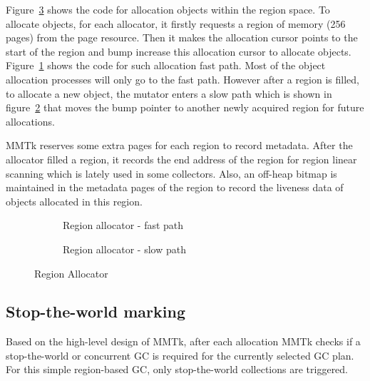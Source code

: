 Figure~\ref{fig:allocator} shows the code for allocation objects within the region space.
To allocate objects, for each allocator, it firstly requests a region of memory (256 pages) from the page resource.
Then it makes the allocation cursor points to the start of the region and bump increase this
allocation cursor to allocate objects. Figure~\ref{fig:allocator:fast} shows the code for such
allocation fast path. Most of the object allocation processes will only go to the
fast path. 
However after a region is filled, to allocate a new object, the mutator enters a slow path
which is shown in figure~\ref{fig:allocator:slow} that moves the bump pointer to another newly acquired region for future allocations.

MMTk reserves some extra pages for each region to record metadata.
After the allocator filled a region, it records the end address of the region for 
region linear scanning which is lately used in some collectors. Also, an off-heap bitmap is
maintained in the metadata pages of the region to record the liveness data of objects allocated
in this region.

\begin{figure}
  \centering
  \begin{subfigure}[a]{\textwidth}
    
    \caption{Region allocator - fast path}
    \label{fig:allocator:fast}
  \end{subfigure}

  \begin{subfigure}[b]{\textwidth}
    
    \caption{Region allocator - slow path}
    \label{fig:allocator:slow}
  \end{subfigure}

  \caption{Region Allocator}
  \label{fig:allocator}
\end{figure}

\subsection{Stop-the-world marking}

Based on the high-level design of MMTk, after each allocation MMTk checks if a stop-the-world
or concurrent GC is required for the currently selected GC plan.
For this simple region-based GC, only stop-the-world collections are triggered.

